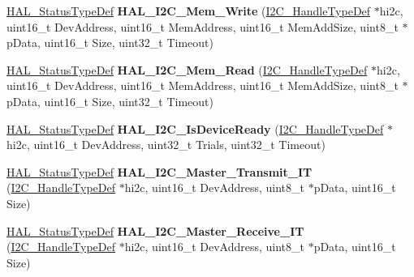 \begin{DoxyCompactItemize}
\item 
\hypertarget{group___i2_c___exported___functions___group2_ga33e725a824eb672f9f999d9d5ce088fb}{\hyperlink{stm32l1xx__hal__def_8h_a63c0679d1cb8b8c684fbb0632743478f}{H\-A\-L\-\_\-\-Status\-Type\-Def} {\bfseries H\-A\-L\-\_\-\-I2\-C\-\_\-\-Mem\-\_\-\-Write} (\hyperlink{struct_i2_c___handle_type_def}{I2\-C\-\_\-\-Handle\-Type\-Def} $\ast$hi2c, uint16\-\_\-t Dev\-Address, uint16\-\_\-t Mem\-Address, uint16\-\_\-t Mem\-Add\-Size, uint8\-\_\-t $\ast$p\-Data, uint16\-\_\-t Size, uint32\-\_\-t Timeout)}\label{group___i2_c___exported___functions___group2_ga33e725a824eb672f9f999d9d5ce088fb}

\item 
\hypertarget{group___i2_c___exported___functions___group2_ga7b593a1b85bd989dd002ee209eae4ad2}{\hyperlink{stm32l1xx__hal__def_8h_a63c0679d1cb8b8c684fbb0632743478f}{H\-A\-L\-\_\-\-Status\-Type\-Def} {\bfseries H\-A\-L\-\_\-\-I2\-C\-\_\-\-Mem\-\_\-\-Read} (\hyperlink{struct_i2_c___handle_type_def}{I2\-C\-\_\-\-Handle\-Type\-Def} $\ast$hi2c, uint16\-\_\-t Dev\-Address, uint16\-\_\-t Mem\-Address, uint16\-\_\-t Mem\-Add\-Size, uint8\-\_\-t $\ast$p\-Data, uint16\-\_\-t Size, uint32\-\_\-t Timeout)}\label{group___i2_c___exported___functions___group2_ga7b593a1b85bd989dd002ee209eae4ad2}

\item 
\hypertarget{group___i2_c___exported___functions___group2_gade6a669a25f0e99ef7fd52724acb3dec}{\hyperlink{stm32l1xx__hal__def_8h_a63c0679d1cb8b8c684fbb0632743478f}{H\-A\-L\-\_\-\-Status\-Type\-Def} {\bfseries H\-A\-L\-\_\-\-I2\-C\-\_\-\-Is\-Device\-Ready} (\hyperlink{struct_i2_c___handle_type_def}{I2\-C\-\_\-\-Handle\-Type\-Def} $\ast$hi2c, uint16\-\_\-t Dev\-Address, uint32\-\_\-t Trials, uint32\-\_\-t Timeout)}\label{group___i2_c___exported___functions___group2_gade6a669a25f0e99ef7fd52724acb3dec}

\item 
\hypertarget{group___i2_c___exported___functions___group2_ga48b84e0cff0e44d10e10bf9cc5a6726d}{\hyperlink{stm32l1xx__hal__def_8h_a63c0679d1cb8b8c684fbb0632743478f}{H\-A\-L\-\_\-\-Status\-Type\-Def} {\bfseries H\-A\-L\-\_\-\-I2\-C\-\_\-\-Master\-\_\-\-Transmit\-\_\-\-I\-T} (\hyperlink{struct_i2_c___handle_type_def}{I2\-C\-\_\-\-Handle\-Type\-Def} $\ast$hi2c, uint16\-\_\-t Dev\-Address, uint8\-\_\-t $\ast$p\-Data, uint16\-\_\-t Size)}\label{group___i2_c___exported___functions___group2_ga48b84e0cff0e44d10e10bf9cc5a6726d}

\item 
\hypertarget{group___i2_c___exported___functions___group2_ga2aebdb302ffc0a4dff28dc2c8b59e1e9}{\hyperlink{stm32l1xx__hal__def_8h_a63c0679d1cb8b8c684fbb0632743478f}{H\-A\-L\-\_\-\-Status\-Type\-Def} {\bfseries H\-A\-L\-\_\-\-I2\-C\-\_\-\-Master\-\_\-\-Receive\-\_\-\-I\-T} (\hyperlink{struct_i2_c___handle_type_def}{I2\-C\-\_\-\-Handle\-Type\-Def} $\ast$hi2c, uint16\-\_\-t Dev\-Address, uint8\-\_\-t $\ast$p\-Data, uint16\-\_\-t Size)}\label{group___i2_c___exported___functions___group2_ga2aebdb302ffc0a4dff28dc2c8b59e1e9}


\end{DoxyCompactItemize}
